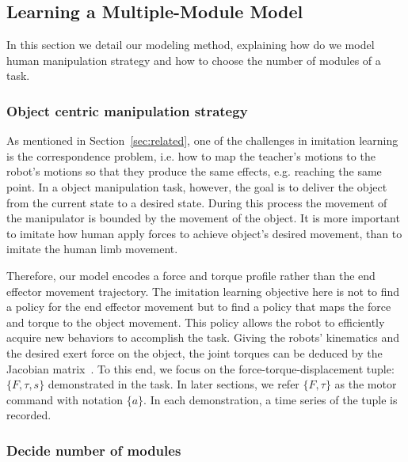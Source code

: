 \documentclass[preprint,12pt]{elsarticle}
\begin{document}
\subsection{Learning a Multiple-Module Model}
\label{sec:learn}
In this section we detail our modeling method, explaining how do we model human manipulation strategy and how to choose the number of modules of a task.

\subsubsection{Object centric manipulation strategy}
\label{sec:objectlevel}
As mentioned in Section~\ref{sec:related}, one of the challenges in imitation learning is the correspondence problem, i.e. how to map the teacher's motions to the robot's motions so that they produce the same effects, e.g. reaching the same point. %
In a object manipulation task, however, the goal is to deliver the object from the current state to a desired state. During this process the movement of the manipulator is bounded by the movement of the object. It is more important to imitate how human apply forces to achieve object's desired movement, than to imitate the human limb movement. 

Therefore, our model encodes a force and torque profile rather than the end effector movement trajectory. The imitation learning objective here is not to find a policy for the end effector movement but to find a policy that maps the force and torque to the object movement. This policy allows the robot to efficiently acquire new behaviors to accomplish the task. %
Giving the robots' kinematics and the desired exert force on the object, the joint torques can be deduced by the Jacobian matrix~\cite{okamura2000overview}. To this end, we focus on the force-torque-displacement tuple: $\{F,\tau,s\}$ demonstrated in the task. In later sections, we refer $\{F,\tau\}$ as the motor command with notation $\{a\}$. In each demonstration, a time series of the tuple is recorded.



\subsubsection{Decide number of modules}
\label{sec:cluster}
\end{document}
